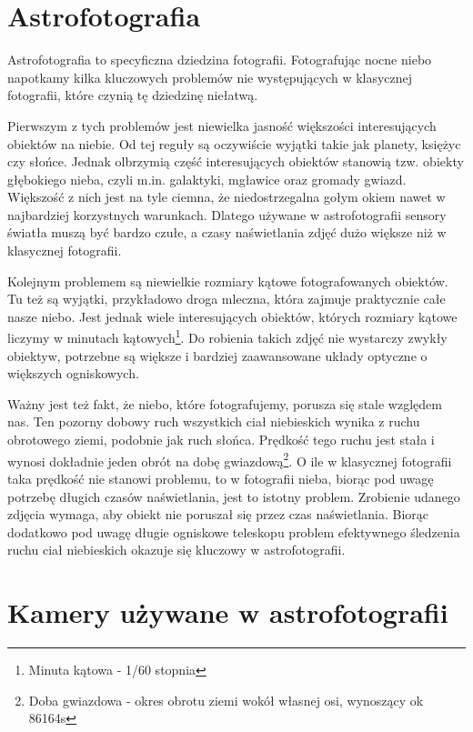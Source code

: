 \label{cha:wstep}

\section{Astrofotografia}

Astrofotografia to specyficzna dziedzina fotografii. Fotografując nocne niebo
napotkamy kilka kluczowych problemów nie występujących w klasycznej fotografii,
które czynią tę dziedzinę niełatwą.

Pierwszym z tych problemów jest niewielka jasność większości interesujących
obiektów na niebie. Od tej reguły są oczywiście wyjątki takie jak planety,
księżyc czy słońce. Jednak olbrzymią część interesujących obiektów stanowią tzw.
obiekty głębokiego nieba, czyli m.in. galaktyki, mgławice oraz gromady gwiazd.
Większość z nich jest na tyle ciemna, że niedostrzegalna gołym okiem nawet
w najbardziej korzystnych warunkach. Dlatego używane w astrofotografii sensory
światła muszą być bardzo czułe, a czasy naświetlania zdjęć dużo większe niż
w klasycznej fotografii.

Kolejnym problemem są niewielkie rozmiary kątowe fotografowanych obiektów. Tu
też są wyjątki, przykładowo droga mleczna, która zajmuje praktycznie całe nasze
niebo. Jest jednak wiele interesujących obiektów, których rozmiary kątowe
liczymy w minutach kątowych\footnote{Minuta kątowa - 1/60 stopnia}. Do robienia
takich zdjęć nie wystarczy zwykły obiektyw, potrzebne są większe i bardziej
zaawansowane układy optyczne o większych ogniskowych.

Ważny jest też fakt, że niebo, które fotografujemy, porusza się stale względem
nas. Ten pozorny dobowy ruch wszystkich ciał niebieskich wynika z ruchu
obrotowego ziemi, podobnie jak ruch słońca. Prędkość tego ruchu jest stała
i wynosi dokładnie jeden obrót na dobę gwiazdową\footnote{Doba gwiazdowa - okres
obrotu ziemi wokół własnej osi, wynoszący ok 86164s}.  O ile w klasycznej
fotografii taka prędkość nie stanowi problemu, to w fotografii nieba, biorąc pod
uwagę potrzebę długich czasów naświetlania, jest to istotny problem. Zrobienie
udanego zdjęcia wymaga, aby obiekt nie poruszał się przez czas naświetlania.
Biorąc dodatkowo pod uwagę długie ogniskowe teleskopu problem efektywnego
śledzenia ruchu ciał niebieskich okazuje się kluczowy w astrofotografii.

\section{Kamery używane w astrofotografii}

